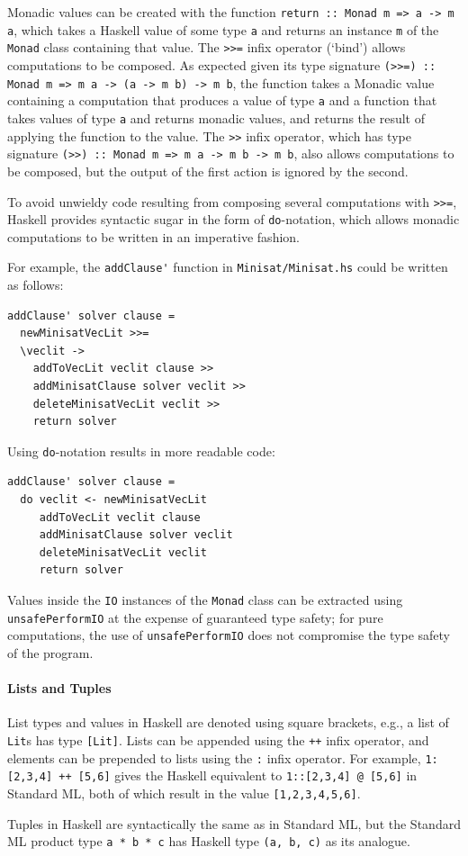 \documentclass[12pt,a4paper,twoside,openright]{report}
\begin{document}
{Monadic values can be created with the function
\verb,return :: Monad m => a -> m a,, which takes a Haskell
value of some type \verb,a, and returns an instance \verb,m, of the
\verb,Monad, class containing that value.
The \verb,>>=, infix operator (`bind') allows computations to be composed.
As expected given its type signature
\verb,(>>=) :: Monad m => m a -> (a -> m b) -> m b,, the function
takes a Monadic value containing a computation that produces a value of type
\verb,a, and a function that takes values of type \verb,a, and returns
monadic values, and returns the result of applying the function to the value.
The \verb,>>, infix operator, which has type signature
\verb,(>>) :: Monad m => m a -> m b -> m b,, also allows computations to be composed,
but the output of the first action is ignored by the second.

To avoid unwieldy code resulting from composing several
computations with \verb,>>=,, Haskell provides syntactic sugar
in the form of \verb,do,-notation, which allows monadic computations
to be written in an imperative fashion.

For example, the \verb,addClause', function in \verb,Minisat/Minisat.hs, could
be written as follows:
\begin{lstlisting}
addClause' solver clause =
  newMinisatVecLit >>=
  \veclit ->
    addToVecLit veclit clause >> 
    addMinisatClause solver veclit >>
    deleteMinisatVecLit veclit >>
    return solver
\end{lstlisting}
Using \verb,do,-notation results in more readable code:
\begin{lstlisting}
addClause' solver clause =
  do veclit <- newMinisatVecLit
     addToVecLit veclit clause
     addMinisatClause solver veclit
     deleteMinisatVecLit veclit
     return solver
\end{lstlisting}

Values inside the \verb,IO, instances of the \verb,Monad, class can be extracted
using \verb,unsafePerformIO, at the expense of guaranteed type safety; for pure
computations, the use of \verb,unsafePerformIO, does not compromise the type
safety of the program.
}

\paragraph{Lists and Tuples}{
List types and values in Haskell are denoted using square brackets, e.g.,
a list of \verb,Lit,s has type \verb,[Lit],.
Lists can be appended using the \verb,++, infix operator, and elements
can be prepended to lists using the \verb,:, infix operator.
For example, \verb.1:[2,3,4] ++ [5,6]. gives the Haskell equivalent to
\verb.1::[2,3,4] @ [5,6]. in Standard ML, both of which result in
the value \verb.[1,2,3,4,5,6]..

Tuples in Haskell are syntactically the same as in Standard ML, but the
Standard ML product type \verb,a * b * c, has Haskell type \verb.(a, b, c).
as its analogue.
}
\end{document}
